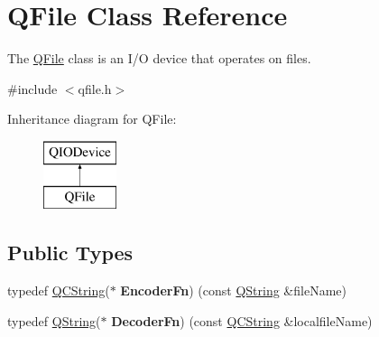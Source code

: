 \hypertarget{class_q_file}{}\section{Q\+File Class Reference}
\label{class_q_file}


The \mbox{\hyperlink{class_q_file}{Q\+File}} class is an I/O device that operates on files.  




{\ttfamily \#include $<$qfile.\+h$>$}

Inheritance diagram for Q\+File\+:\begin{figure}[H]
\begin{center}
\leavevmode
\includegraphics[height=2.000000cm]{class_q_file}
\end{center}
\end{figure}
\subsection*{Public Types}
\begin{DoxyCompactItemize}
\item 
\mbox{\label{class_q_file_abc28a2af8ddad44c42b316e9f15af9c2}} 
typedef \mbox{\hyperlink{class_q_c_string}{Q\+C\+String}}($\ast$ {\bfseries Encoder\+Fn}) (const \mbox{\hyperlink{class_q_string}{Q\+String}} \&file\+Name)
\item 
\mbox{\label{class_q_file_a79dc4d72e10f49d4430b299ebc34ec9e}} 
typedef \mbox{\hyperlink{class_q_string}{Q\+String}}($\ast$ {\bfseries Decoder\+Fn}) (const \mbox{\hyperlink{class_q_c_string}{Q\+C\+String}} \&localfile\+Name)
\end{DoxyCompactItemize}
